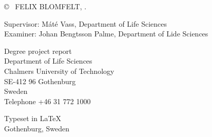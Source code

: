 \copyright ~ FELIX BLOMFELT, \the\year. \setlength{\parskip}{1cm}

Supervisor: Máté Vass, Department of Life Sciences\\
Examiner: Johan Bengtsson Palme, Department of Lide Sciences \setlength{\parskip}{1cm}

Degree project report \the\year\\	
Department of Life Sciences\\
Chalmers University of Technology\\
SE-412 96 Gothenburg\\
Sweden\\
Telephone +46 31 772 1000 \setlength{\parskip}{0.5cm}

\vfill

Typeset in \LaTeX \tagtemp\\
Gothenburg, Sweden \the\year
